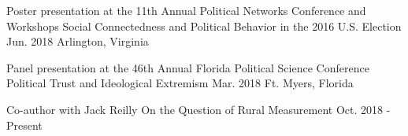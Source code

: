 

\begin{cventries}



\cventry
  {Poster presentation at the 11th Annual Political Networks Conference and Workshops} %
  {Social Connectedness and Political Behavior in the 2016 U.S. Election} %
  {Jun. 2018} %
  {Arlington, Virginia} %
  {}

\vspace{-.25cm}
\cventry
  {Panel presentation at the 46th Annual Florida Political Science Conference} %
  {Political Trust and Ideological Extremism} %
  {Mar. 2018} %
  {Ft. Myers, Florida} %
  {}

\vspace{-.25cm}
\cventry
  {Co-author with Jack Reilly} %
  {On the Question of Rural Measurement} %
  {Oct. 2018 - Present} %
  {} %
  {}

\vspace{-.25cm}

\end{cventries}

